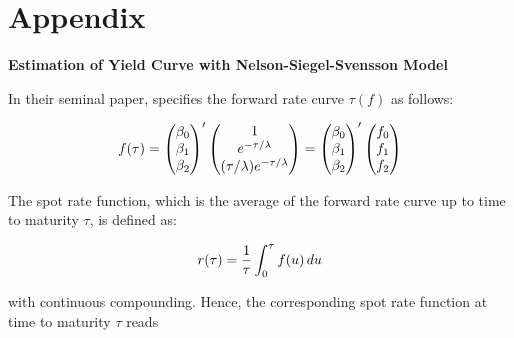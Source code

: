 \section*{Appendix}

{ \bf Estimation of Yield Curve with Nelson-Siegel-Svensson Model}

\noindent In their seminal paper, \citet{nelson1987parsimonious} specifies the forward rate curve $\tau(f)$ as follows:

\begin{equation}\notag
    f(\tau)=
    \begin{pmatrix}
    \beta_0 \\ \beta_1 \\ \beta_2    
    \end{pmatrix}'
    \begin{pmatrix}
        1 \\ e^{-\tau/\lambda} \\ (\tau / \lambda) e^{-\tau/\lambda}
    \end{pmatrix}
    =
    \begin{pmatrix}
    \beta_0 \\ \beta_1 \\ \beta_2   
    \end{pmatrix}'
    \begin{pmatrix}
    f_0 \\ f_1 \\ f_2  
    \end{pmatrix}
\end{equation}


\noindent The spot rate function, which is the average of the forward rate curve up to time to maturity $\tau$, is defined as:

\begin{equation}\notag
    r(\tau)= \frac{1}{\tau}\int_0^\tau f(u)\,du
\end{equation}

\noindent with continuous compounding. Hence, the corresponding spot rate function at time to maturity $\tau$ reads

\newpage



\newpage


